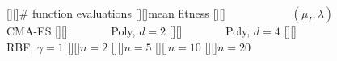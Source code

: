 \documentclass[10pt]{article}\usepackage{graphicx,psfrag}\usepackage{amsmath}
\begin{document}
\thispagestyle{empty}\begin{figure}
[][]{\small \# function evaluations}
[][]{\small mean fitness}
[][]{\small ~~~~~~~~~~~ $(\mu_I,\lambda)$CMA-ES}
[][]{\small ~~~~~~~ Poly, $d=2$}
[][]{\small ~~~~~~~ Poly, $d=4$}
[][]{\small ~~~~~~~~ RBF, $\gamma=1$}
[][]{\small $n=2$}
[][]{\small $n=5$}
[][]{\small $n=10$}
[][]{\small $n=20$}
\end{figure}
\end{document}
